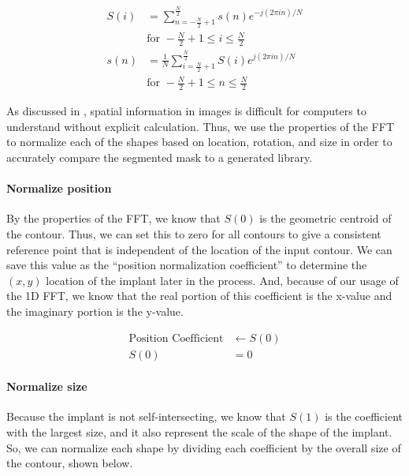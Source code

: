 \begin{equation}
    \begin{aligned}
        S(i) &= \sum_{n = -\frac{N}{2} + 1}^{\frac{N}{2}} s(n)e^{-j(2\pi i n)/N} \\
        &\text{for } -\frac{N}{2} + 1 \le i \le \frac{N}{2} \\
        s(n) &= \frac{1}{N} \sum_{i = \frac{N}{2} + 1}^{\frac{N}{2}} S(i)e^{j(2\pi i n )/N}\\
        &\text{for } -\frac{N}{2} + 1 \le n \le \frac{N}{2}
    \end{aligned}
    \label{eq:fft}
\end{equation}

As discussed in , spatial information in images is difficult for computers to understand without explicit calculation.
Thus, we use the properties of the FFT to normalize each of the shapes based on location, rotation, and size in order to accurately compare the segmented mask to a generated library.

\paragraph*{Normalize position}
By the properties of the FFT, we know that $S(0)$ is the geometric centroid of the contour. Thus, we can set this to zero for all contours to give a consistent reference point that is independent of the location of the input contour. We can save this value as the ``position normalization coefficient'' to determine the $(x,y)$ location of the implant later in the process. And, because of our usage of the 1D FFT, we know that the real portion of this coefficient is the x-value and the imaginary portion is the y-value.

\begin{equation}
    \begin{aligned}
        \text{Position Coefficient} &\leftarrow S(0) \\
        S(0) &= 0
    \end{aligned}
\end{equation}

\paragraph*{Normalize size}
Because the implant is not self-intersecting, we know that $S(1)$ is the coefficient with the largest size, and it also represent the scale of the shape of the implant. So, we can normalize each shape by dividing each coefficient by the overall size of the contour, shown below.

